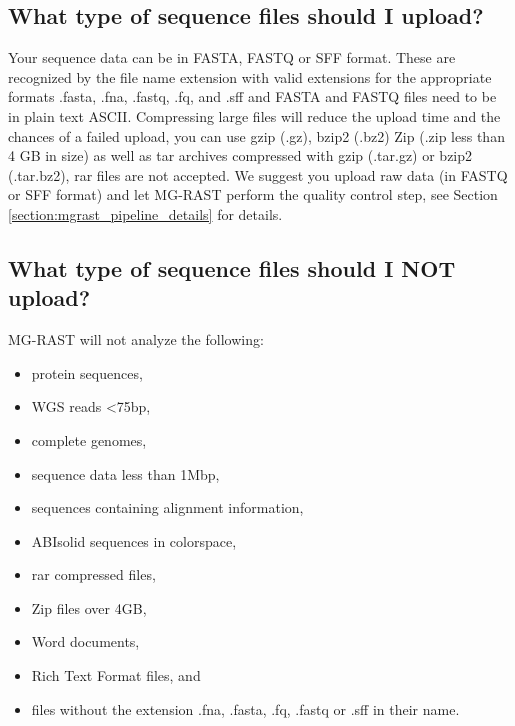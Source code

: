 \documentclass[12pt,fullpage]{report}
\begin{document}
\subsection{What type of sequence files should I upload?}
Your sequence data can be in FASTA, FASTQ or SFF format. These are recognized by the file name extension with valid extensions for the appropriate formats .fasta, .fna, .fastq, .fq, and .sff and FASTA and FASTQ files need to be in plain text ASCII.
Compressing large files will reduce the upload time and the chances of a failed upload, you can use gzip (.gz), bzip2 (.bz2) Zip (.zip less than 4 GB in size) as well as tar archives compressed with gzip (.tar.gz) or bzip2 (.tar.bz2), rar files are not accepted.
We suggest you upload raw data (in FASTQ or SFF format) and let MG-RAST perform the quality control step, see Section \ref{section:mgrast_pipeline_details} for details.
\subsection{What type of sequence files should I NOT upload?}
MG-RAST will not analyze the following:
\begin{itemize}
\item  protein sequences,
\item  WGS reads \textless  75bp,
\item  complete genomes,
\item  sequence data less than 1Mbp,
\item  sequences containing alignment information,
\item  ABIsolid sequences in colorspace,
\item  rar compressed files,
\item  Zip files over 4GB,
\item  Word documents,
\item  Rich Text Format files, and
\item  files without the extension .fna, .fasta, .fq, .fastq or .sff in their name.
\end{itemize}
\end{document}
